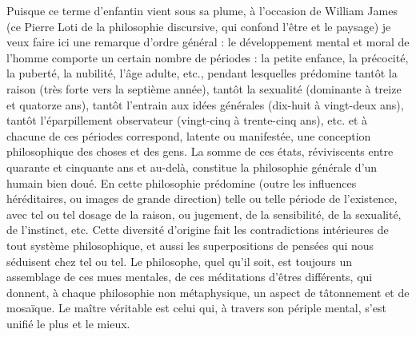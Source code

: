 \documentclass[french,twoside]{book} %
\begin{document}
Puisque ce terme d’enfantin vient sous sa plume, à l’occasion de William James (ce Pierre Loti de la philosophie discursive, qui confond l’être et le paysage) je veux faire ici une remarque d’ordre général : le développement mental et moral de l’homme comporte un certain nombre de périodes : la petite enfance, la précocité, la puberté, la nubilité, l’âge adulte, etc., pendant lesquelles prédomine tantôt la raison (très forte vers la septième année), tantôt la sexualité (dominante à treize et quatorze ans), tantôt l’entrain aux idées générales (dix-huit à vingt-deux ans), tantôt l’éparpillement observateur (vingt-cinq à trente-cinq ans), etc. et à chacune de ces périodes correspond, latente ou manifestée, une conception philosophique des choses et des gens. La somme de ces états, réviviscents entre quarante et cinquante ans et au-delà, constitue la philosophie générale d’un humain bien doué. En cette philosophie prédomine (outre les influences héréditaires, ou images de grande direction) telle ou telle période de l’existence, avec tel ou tel dosage de la raison, ou jugement, de la sensibilité, de la sexualité, de l’instinct, etc. Cette diversité d’origine fait les contradictions intérieures de tout système philosophique, et aussi les superpositions de pensées qui nous séduisent chez tel ou tel. Le philosophe, quel qu’il soit, est toujours un assemblage de ces mues mentales, de ces méditations d’êtres différents, qui donnent, à chaque philosophie non métaphysique, un aspect de tâtonnement et de mosaïque. Le maître véritable est celui qui, à travers son périple mental, s’est unifié le plus et le mieux.\par
\end{document}
